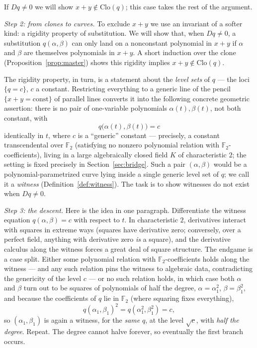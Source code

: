 \documentclass[11pt]{article}
\theoremstyle{definition}
\theoremstyle{remark}
\newcommand{\F}{\mathbb{F}}
\newcommand{\Clo}{\mathrm{Clo}}
\begin{document}
If $Dq \neq 0$ we will show $x + y \notin \Clo(q)$; this case takes
the rest of the argument.

\medskip
\noindent\emph{Step 2: from clones to curves.}
To exclude $x+y$ we use an invariant of a softer kind: a rigidity
property of substitution.  We will show that, when $Dq \neq 0$, a
substitution $q(\alpha,\beta)$ can only land on a nonconstant
polynomial in $x+y$ if $\alpha$ and $\beta$ are themselves
polynomials in $x+y$.  A short induction over the clone
(Proposition~\ref{prop:master}) shows this rigidity implies
$x+y \notin \Clo(q)$.

The rigidity property, in turn, is a statement about the \emph{level
sets} of $q$ --- the loci $\{q = c\}$, $c$ a constant.
Restricting everything to a generic line of the pencil
$\{x + y = \text{const}\}$ of parallel lines converts it into the
following concrete
geometric assertion: there is no pair of one-variable polynomials
$\alpha(t), \beta(t)$, not both constant, with
\[
  q\bigl(\alpha(t), \beta(t)\bigr) = c
\]
identically in $t$, where $c$ is a ``generic'' constant --- precisely,
a constant transcendental over $\F_2$ (satisfying no nonzero
polynomial relation with $\F_2$-coefficients), living in a large
algebraically closed field $K$ of characteristic $2$; the setting is
fixed precisely in Section~\ref{sec:bridge}.  Such a pair
$(\alpha, \beta)$ would be a polynomial-parametrized curve lying
inside a single generic level set of $q$; we call it a
\emph{witness} (Definition~\ref{def:witness}).  The task is to show witnesses do not exist when
$Dq \neq 0$.

\medskip
\noindent\emph{Step 3: the descent.}
Here is the idea in one paragraph.  Differentiate the witness equation
$q(\alpha,\beta) = c$ with respect to $t$.  In characteristic $2$,
derivatives interact with squares in extreme ways (squares have
derivative zero; conversely, over a perfect field, anything with
derivative zero \emph{is} a square), and the derivative calculus along
the witness forces a great deal of square structure.  The endgame is a
case split.  Either some polynomial relation with $\F_2$-coefficients holds
along the witness --- and any such relation pins
the witness to algebraic data, contradicting the genericity of the
level $c$ --- or no such relation holds, in which case both $\alpha$
and $\beta$ turn
out to be squares of polynomials of half the degree,
$\alpha = \alpha_1^2$, $\beta = \beta_1^2$, and because the
coefficients of $q$ lie in $\F_2$ (where squaring fixes everything),
\[
  q(\alpha_1, \beta_1)^2 = q(\alpha_1^2, \beta_1^2) = c,
\]
so $(\alpha_1, \beta_1)$ is again a witness, for the \emph{same} $q$,
at the level $\sqrt{c}$, with \emph{half the degree}.  Repeat.  The
degree cannot halve forever, so eventually the first branch occurs.
\end{document}
